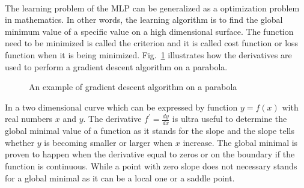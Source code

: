 \paragraph{}
The learning problem of the MLP can be generalized as a optimization problem in mathematics.
In other words, the learning algorithm is to find the global minimum value of a specific value on a high dimensional surface.
The function need to be minimized is called the criterion and it is called cost function or loss function when it is being minimized.
Fig.~\ref{lr_fig:ml_gradient_optimization} illustrates how the derivatives are used to perform a gradient descent algorithm on a parabola.
\begin{figure}
    \centering
    \caption[Example of gradient descent algorithm on a parabola]{An example of gradient descent algorithm on a parabola}
    \label{lr_fig:ml_gradient_optimization}
\end{figure}
%
In a two dimensional curve which can be expressed by function $y=f(x)$ with real numbers $x$ and $y$.
The derivative $f^\prime=\frac{dy}{dx}$ is ultra useful to determine the global minimal value of a function as it stands for the slope and the slope tells whether $y$ is becoming smaller or larger when $x$ increase.
The global minimal is proven to happen when the derivative equal to zeros or on the boundary if the function is continuous.
While a point with zero slope does not necessary stands for a global minimal as it can be a local one or a saddle point.
